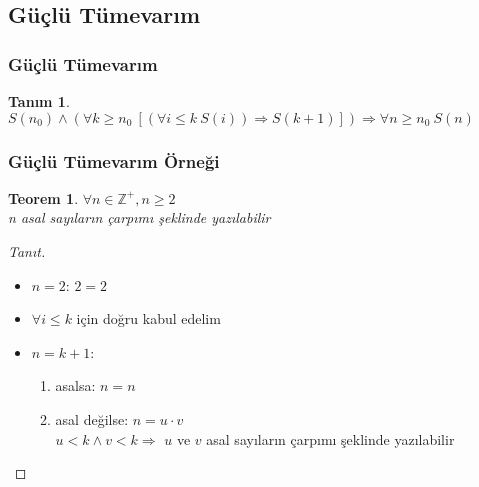 \documentclass[dvipsnames]{beamer}
\theoremstyle{definition}
\newtheorem{tanim}[theorem]{Tanım}
\theoremstyle{example}
\theoremstyle{plain}
\newtheorem{teorem}[theorem]{Teorem}
\begin{document}
\subsection{Güçlü Tümevarım}

\begin{frame}
  \frametitle{Güçlü Tümevarım}

  \begin{tanim}
    $S(n_0) \wedge
      (\forall k \geq n_0~[(\forall i \leq k~S(i)) \Rightarrow S(k+1)])
      \Rightarrow \forall n \geq n_0~S(n)$
  \end{tanim}
\end{frame}

\begin{frame}
  \frametitle{Güçlü Tümevarım Örneği}

  \begin{teorem}
    $\forall n \in \mathbb{Z}^+, n \geq 2$\\
      n asal sayıların çarpımı şeklinde yazılabilir
  \end{teorem}

  \pause
  \begin{proof}[Tanıt]
    \begin{itemize}
      \item $n=2$: $2=2$

      \pause
      \item $\forall i \leq k$ için doğru kabul edelim

      \pause
      \item $n=k+1$:
      \begin{enumerate}
        \item asalsa: $n=n$

        \pause
        \item asal değilse: $n=u \cdot v$\\
          $u < k \wedge v < k \Rightarrow$ $u$ ve $v$ asal sayıların çarpımı
          şeklinde yazılabilir
      \end{enumerate}
    \end{itemize}
  \end{proof}
\end{frame}
\end{document}
